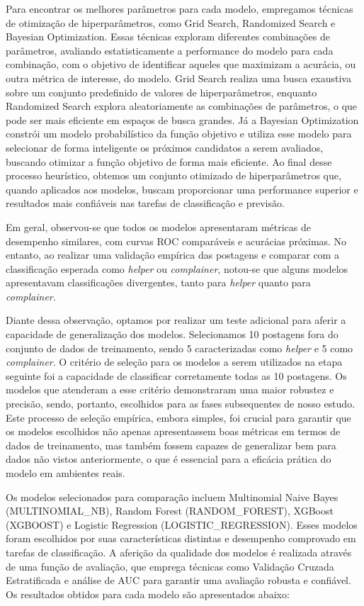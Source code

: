 Para encontrar os melhores parâmetros para cada modelo, empregamos técnicas de otimização de hiperparâmetros, como Grid Search, Randomized Search e Bayesian Optimization. Essas técnicas exploram diferentes combinações de parâmetros, avaliando estatisticamente a performance do modelo para cada combinação, com o objetivo de identificar aqueles que maximizam a acurácia, ou outra métrica de interesse, do modelo. Grid Search realiza uma busca exaustiva sobre um conjunto predefinido de valores de hiperparâmetros, enquanto Randomized Search explora aleatoriamente as combinações de parâmetros, o que pode ser mais eficiente em espaços de busca grandes. Já a Bayesian Optimization constrói um modelo probabilístico da função objetivo e utiliza esse modelo para selecionar de forma inteligente os próximos candidatos a serem avaliados, buscando otimizar a função objetivo de forma mais eficiente. Ao final desse processo heurístico, obtemos um conjunto otimizado de hiperparâmetros que, quando aplicados aos modelos, buscam proporcionar uma performance superior e resultados mais confiáveis nas tarefas de classificação e previsão.

Em geral, observou-se que todos os modelos apresentaram métricas de desempenho similares, com curvas ROC comparáveis e acurácias próximas. No entanto, ao realizar uma validação empírica das postagens e comparar com a classificação esperada como \textit{helper} ou \textit{complainer}, notou-se que alguns modelos apresentavam classificações divergentes, tanto para \textit{helper} quanto para \textit{complainer}.

Diante dessa observação, optamos por realizar um teste adicional para aferir a capacidade de generalização dos modelos. Selecionamos 10 postagens fora do conjunto de dados de treinamento, sendo 5 caracterizadas como \textit{helper} e 5 como \textit{complainer}. O critério de seleção para os modelos a serem utilizados na etapa seguinte foi a capacidade de classificar corretamente todas as 10 postagens. Os modelos que atenderam a esse critério demonstraram uma maior robustez e precisão, sendo, portanto, escolhidos para as fases subsequentes de nosso estudo. Este processo de seleção empírica, embora simples, foi crucial para garantir que os modelos escolhidos não apenas apresentassem boas métricas em termos de dados de treinamento, mas também fossem capazes de generalizar bem para dados não vistos anteriormente, o que é essencial para a eficácia prática do modelo em ambientes reais.

Os modelos selecionados para comparação incluem Multinomial Naive Bayes (MULTINOMIAL\_NB), Random Forest (RANDOM\_FOREST), XGBoost (XGBOOST) e Logistic Regression (LOGISTIC\_REGRESSION). Esses modelos foram escolhidos por suas características distintas e desempenho comprovado em tarefas de classificação. A aferição da qualidade dos modelos é realizada através de uma função de avaliação, que emprega técnicas como Validação Cruzada Estratificada e análise de AUC para garantir uma avaliação robusta e confiável. Os resultados obtidos para cada modelo são apresentados abaixo:

